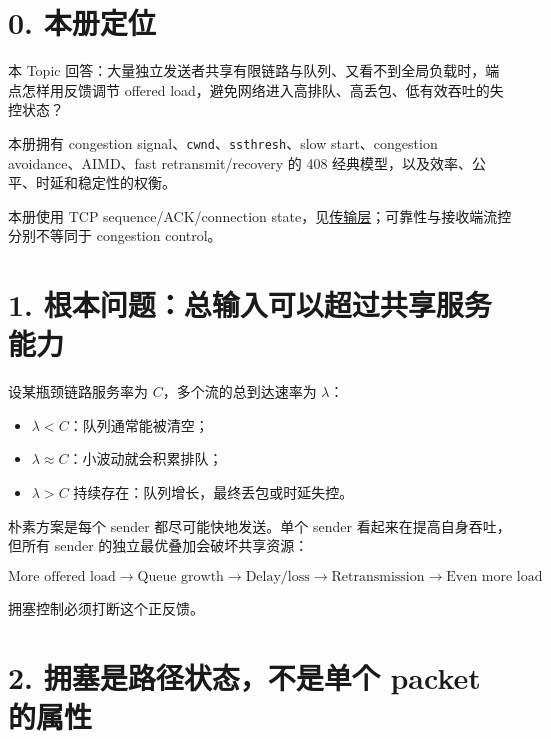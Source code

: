 \documentclass[UTF8,fontset=none,11pt,a4paper]{ctexart}
\providecommand{\tightlist}{\setlength{\itemsep}{0pt}\setlength{\parskip}{0pt}}
\providecommand{\passthrough}[1]{#1}
\begin{document}
\section{0. 本册定位}\label{0-ux672cux518cux5b9aux4f4d}

本 Topic
回答：大量独立发送者共享有限链路与队列、又看不到全局负载时，端点怎样用反馈调节
offered load，避免网络进入高排队、高丢包、低有效吞吐的失控状态？

本册拥有 congestion
signal、\passthrough{\lstinline!cwnd!}、\passthrough{\lstinline!ssthresh!}、slow
start、congestion avoidance、AIMD、fast retransmit/recovery 的 408
经典模型，以及效率、公平、时延和稳定性的权衡。

本册使用 TCP sequence/ACK/connection
state，见\href{../06_传输层_端点_UDP与TCP状态机/README.md}{传输层}；可靠性与接收端流控分别不等同于
congestion control。

\section{1.
根本问题：总输入可以超过共享服务能力}\label{1-ux6839ux672cux95eeux9898ux603bux8f93ux5165ux53efux4ee5ux8d85ux8fc7ux5171ux4eabux670dux52a1ux80fdux529b}

设某瓶颈链路服务率为 \(C\)，多个流的总到达速率为 \(\lambda\)：

\begin{itemize}
\tightlist
\item
  \(\lambda<C\)：队列通常能被清空；
\item
  \(\lambda\approx C\)：小波动就会积累排队；
\item
  \(\lambda>C\) 持续存在：队列增长，最终丢包或时延失控。
\end{itemize}

朴素方案是每个 sender 都尽可能快地发送。单个 sender
看起来在提高自身吞吐，但所有 sender 的独立最优叠加会破坏共享资源：

\[
\boxed{
\text{More offered load}
\to \text{Queue growth}
\to \text{Delay/loss}
\to \text{Retransmission}
\to \text{Even more load}
}
\]

拥塞控制必须打断这个正反馈。

\section{2. 拥塞是路径状态，不是单个 packet
的属性}\label{2-ux62e5ux585eux662fux8defux5f84ux72b6ux6001ux4e0dux662fux5355ux4e2a-packet-ux7684ux5c5eux6027}
\end{document}
